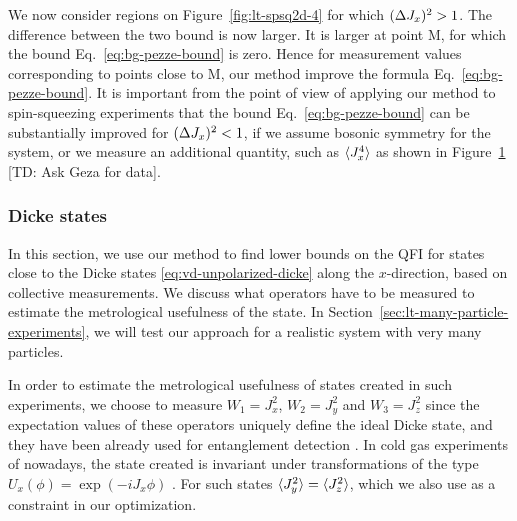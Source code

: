 We now consider regions on Figure~\ref{fig:lt-spsq2d-4} for which $(\Delta J_x )^2>1$.
The difference between the two bound is now larger.
It is larger at point M, for which the bound Eq.~\eqref{eq:bg-pezze-bound} is zero.
Hence for measurement values corresponding to points close to M, our method improve the formula Eq.~\eqref{eq:bg-pezze-bound}.
It is important from the point of view of applying our method to spin-squeezing experiments that the bound Eq.~\eqref{eq:bg-pezze-bound} can be substantially improved for $(\Delta J_x )^2<1$, if we assume bosonic symmetry for the system, or we measure an additional quantity, such as $\langle{J_x^4}\rangle$ as shown in Figure~\ref{fig:lt-adding-jx4-to-the-bound} [TD: Ask Geza for data].
\begin{figure}[htp]
  \centering
  \label{fig:lt-adding-jx4-to-the-bound}
\end{figure}


\subsubsection{Dicke states}
\label{sec:lt-bound-dicke-states}

In this section, we use our method to find lower bounds on the QFI for states close to the Dicke states \eqref{eq:vd-unpolarized-dicke} along the $x$-direction, based on collective measurements.
We discuss what operators have to be measured to estimate the metrological usefulness of the state.
In Section~\ref{sec:lt-many-particle-experiments}, we will test our approach for a realistic system with very many particles.

In order to estimate the metrological usefulness of states created in such experiments, we choose to measure $W_1=J_x^2$, $W_2=J_y^2$ and $W_3=J_z^2$ since the expectation values of these operators uniquely define the ideal Dicke state, and they have been already used for entanglement detection \cite{Luecke2014}.
In cold gas experiments of nowadays, the state created is invariant under transformations of the type $U_{x}(\phi)=\exp(-i J_x \phi)$ \cite{Apellaniz2015}.
For such states $\langle{J_y^2}\rangle=\langle{J_z^2}\rangle$, which we also use as a constraint in our optimization.

